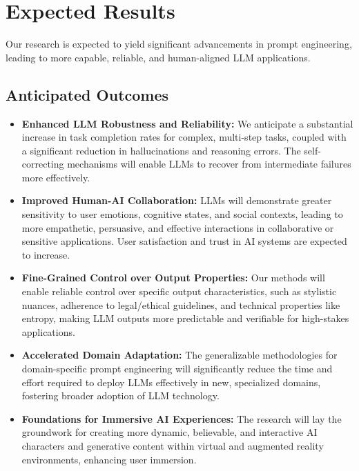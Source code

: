 \documentclass{article}
\begin{document}
\section{Expected Results}

Our research is expected to yield significant advancements in prompt engineering, leading to more capable, reliable, and human-aligned LLM applications.

\subsection{Anticipated Outcomes}
\begin{itemize}
    \item \textbf{Enhanced LLM Robustness and Reliability:} We anticipate a substantial increase in task completion rates for complex, multi-step tasks, coupled with a significant reduction in hallucinations and reasoning errors. The self-correcting mechanisms will enable LLMs to recover from intermediate failures more effectively.
    \item \textbf{Improved Human-AI Collaboration:} LLMs will demonstrate greater sensitivity to user emotions, cognitive states, and social contexts, leading to more empathetic, persuasive, and effective interactions in collaborative or sensitive applications. User satisfaction and trust in AI systems are expected to increase.
    \item \textbf{Fine-Grained Control over Output Properties:} Our methods will enable reliable control over specific output characteristics, such as stylistic nuances, adherence to legal/ethical guidelines, and technical properties like entropy, making LLM outputs more predictable and verifiable for high-stakes applications.
    \item \textbf{Accelerated Domain Adaptation:} The generalizable methodologies for domain-specific prompt engineering will significantly reduce the time and effort required to deploy LLMs effectively in new, specialized domains, fostering broader adoption of LLM technology.
    \item \textbf{Foundations for Immersive AI Experiences:} The research will lay the groundwork for creating more dynamic, believable, and interactive AI characters and generative content within virtual and augmented reality environments, enhancing user immersion.
\end{itemize}
\end{document}

